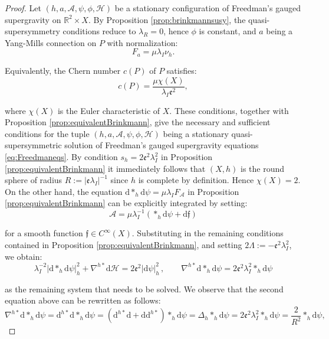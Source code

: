 \documentclass[10pt,a4paper,twoside,reqno]{amsart}
\theoremstyle{plain}
\theoremstyle{definition}
\theoremstyle{remark}
\def\dd{\mathrm{d}}
\def\frf{\mathfrak{f}}
\def\cH{\mathcal{H}}
\def\cA{\mathcal{A}}
\def\cH{\mathcal{H}}
\def\dd{\mathrm{d}}
\begin{document}
\begin{proof}
Let $(h, a, \cA, \psi, \phi, \cH)$ be a stationary configuration of Freedman's gauged supergravity on $\mathbb{R}^2 \times X$. By Proposition \ref{prop:brinkmannsusy}, the quasi-supersymmetry conditions reduce to $\lambda_R = 0$, hence $\phi$ is constant, and $a$ being a Yang-Mills connection on $P$ with normalization:
\begin{equation*}
F_a = \mu\lambda_I \nu_h.
\end{equation*}

\noindent
Equivalently, the Chern number $c(P)$ of $P$ satisfies:
\begin{equation*}
c(P) = \frac{\mu \chi(X)}{\lambda_I \mathfrak{e}^2},
\end{equation*}

\noindent
where $\chi(X)$ is the Euler characteristic of $X$. These conditions, together with Proposition \ref{prop:equivalentBrinkmann}, give the necessary and sufficient conditions for the tuple $(h, a, \cA, \psi, \phi, \cH)$ being a stationary quasi-supersymmetric solution of Freedman's gauged supergravity equations \eqref{eq:Freedmaneqs}. By condition $s_h = 2\mathfrak{e}^2 \lambda_I^2$ in Proposition \ref{prop:equivalentBrinkmann} it immediately follows that $(X,h)$ is the round sphere of radius $R := \vert \mathfrak{e} \lambda_I \vert^{-1}$ since $h$ is complete by definition. Hence $\chi(X)=2$. On the other hand, the equation $\dd\ast_h \dd \psi   = \mu\lambda_I F_{\cA}$ in Proposition \ref{prop:equivalentBrinkmann} can be explicitly integrated by setting:
\begin{equation*}
\cA = \mu \lambda^{-1}_I (\ast_h \dd \psi + \dd \mathfrak{f})
\end{equation*}

\noindent
for a smooth function $\frf \in C^{\infty}(X)$. Substituting in the remaining conditions contained in Proposition \ref{prop:equivalentBrinkmann}, and setting $2 \Lambda  := -  \mathfrak{e}^2 \lambda_I^2$, we obtain:
\begin{equation*}
\lambda_I^{-2}\vert \dd\ast_h \dd\psi \vert^2_{h} + \nabla^{h\ast}\dd \cH     =   2 \mathfrak{e}^2 \vert \dd \psi\vert^2_h \, , \qquad \nabla^{h\ast} \dd \ast_h \dd\psi   =     2 \mathfrak{e}^2   \lambda^2_I \ast_h \dd\psi  
\end{equation*}

\noindent
as the remaining system that needs to be solved. We observe that the second equation above can be rewritten as follows:
\begin{equation*}
\nabla^{h\ast} \dd \ast_h \dd\psi  =  \dd^{h\ast}\dd \ast_h \dd \psi =    (\dd^{h\ast}\dd + \dd \dd^{h\ast}) \ast_h \dd \psi = \Delta_h \ast_h \dd \psi = 2 \mathfrak{e}^2   \lambda^2_I \ast_h \dd\psi = \frac{2}{R^2} \ast_h \dd\psi,
\end{equation*}


\end{proof}
\end{document}
